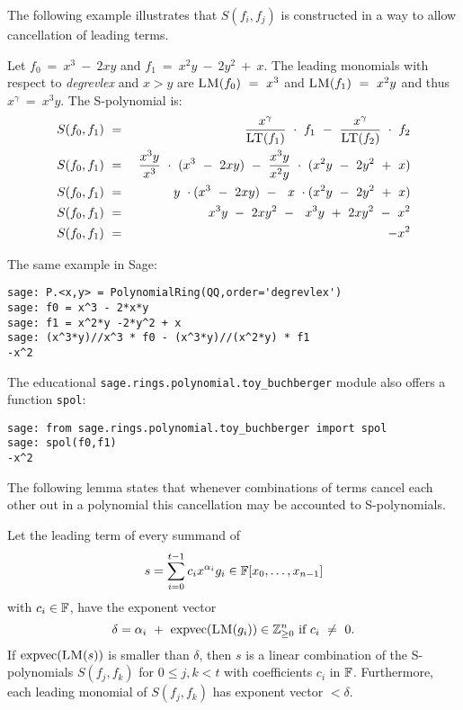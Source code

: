 The following example illustrates that $S(f_i,f_j)$ is constructed in a way to allow cancellation of leading terms.

\begin{example}
Let $f_0\ =\ x^3\ -\ 2xy$ and $f_1\ =\ x^2y\ -\ 2y^2\ +\ x$. The leading monomials with respect to \emph{degrevlex} and $x > y$ are
$\textsc{LM}(f_0)\ =\ x^3$ and $\textsc{LM}(f_1)\ =\ x^2y$ and thus $x^\gamma\ =\ x^3y$. The S-polynomial is:
\begin{eqnarray*}
S(f_0,f_1)\ &=&\ \dfrac{x^\gamma}{\LT(f_1)}\ \cdot\ f_1\ -\
\dfrac{x^\gamma}{\LT(f_2)}\ \cdot\ f_2\\
S(f_0,f_1)\ &=&\ \dfrac{x^3y}{x^3}\ \cdot\ (x^3\ -\ 2xy)\ -\
\dfrac{x^3y}{x^2y}\ \cdot\ (x^2y\ -\ 2y^2\ +\ x)\\
S(f_0,f_1)\ &=&\ y\ \cdot (x^3\ -\ 2xy)\ -\ \ x\ \cdot (x^2y\ -\ 2y^2\ +\ x)\\
S(f_0,f_1)\ &=&\ x^3y\ -\ 2xy^2\ -\ \ x^3y\ +\ 2xy^2\ -\ x^2\\
S(f_0,f_1)\ &=&\ -x^2
\end{eqnarray*}
\end{example}

The same example in Sage:

\begin{lstlisting}
sage: P.<x,y> = PolynomialRing(QQ,order='degrevlex')
sage: f0 = x^3 - 2*x*y
sage: f1 = x^2*y -2*y^2 + x
sage: (x^3*y)//x^3 * f0 - (x^3*y)//(x^2*y) * f1
-x^2
\end{lstlisting}

The educational \verb|sage.rings.polynomial.toy_buchberger| module also offers a function \verb|spol|:

\begin{lstlisting}
sage: from sage.rings.polynomial.toy_buchberger import spol
sage: spol(f0,f1)
-x^2
\end{lstlisting}


The following lemma states that whenever combinations of terms cancel each other out in a polynomial this cancellation may be accounted to S-polynomials.

\begin{lemma}
\label{lemma:cancel}
Let the leading term of every summand of \[s = \sum^{t-1}_{i=0} c_ix^{\alpha_i}g_i \in \mathbb{F}[x_0,\dots,x_{n-1}]\] with $c_i \in \mathbb{F}$, have the exponent vector 
\[\delta = \alpha_i\ +\ \expvec(\LM(g_i)) \in \mathbb{Z}^n_{\geq 0} \textnormal{ if } c_i\ \neq\ 0.\] If $\textnormal{expvec}(\textsc{LM}(s))$ is smaller than $\delta$, then $s$ is a linear combination  of the S-polynomials $S(f_j,f_k)$ for $0 \leq j,k < t$ with coefficients $c_i$ in $\mathbb{F}$. Furthermore, each leading monomial of $S(f_j,f_k)$ has exponent vector $< \delta.$
\end{lemma}


